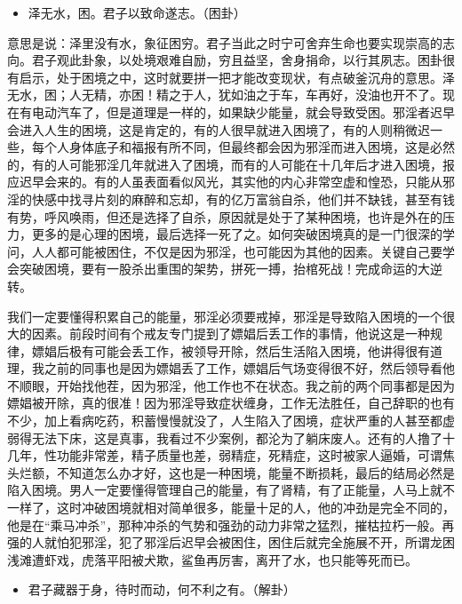 \begin{itemize}\it
    \item 泽无水，困。君子以致命遂志。（困卦）
\end{itemize}

意思是说：泽里没有水，象征困穷。君子当此之时宁可舍弃生命也要实现崇高的志向。君子观此卦象，以处境艰难自励，穷且益坚，舍身捐命，以行其夙志。困卦很有启示，处于困境之中，这时就要拼一把才能改变现状，有点破釜沉舟的意思。泽无水，困；人无精，亦困！精之于人，犹如油之于车，车再好，没油也开不了。现在有电动汽车了，但是道理是一样的，如果缺少能量，就会导致受困。邪淫者迟早会进入人生的困境，这是肯定的，有的人很早就进入困境了，有的人则稍微迟一些，每个人身体底子和福报有所不同，但最终都会因为邪淫而进入困境，这是必然的，有的人可能邪淫几年就进入了困境，而有的人可能在十几年后才进入困境，报应迟早会来的。有的人虽表面看似风光，其实他的内心非常空虚和惶恐，只能从邪淫的快感中找寻片刻的麻醉和忘却，有的亿万富翁自杀，他们并不缺钱，甚至有钱有势，呼风唤雨，但还是选择了自杀，原因就是处于了某种困境，也许是外在的压力，更多的是心理的困境，最后选择一死了之。如何突破困境真的是一门很深的学问，人人都可能被困住，不仅是因为邪淫，也可能因为其他的因素。关键自己要学会突破困境，要有一股杀出重围的架势，拼死一搏，抬棺死战！完成命运的大逆转。

我们一定要懂得积累自己的能量，邪淫必须要戒掉，邪淫是导致陷入困境的一个很大的因素。前段时间有个戒友专门提到了嫖娼后丢工作的事情，他说这是一种规律，嫖娼后极有可能会丢工作，被领导开除，然后生活陷入困境，他讲得很有道理，我之前的同事也是因为嫖娼丢了工作，嫖娼后气场变得很不好，然后领导看他不顺眼，开始找他茬，因为邪淫，他工作也不在状态。我之前的两个同事都是因为嫖娼被开除，真的很准！因为邪淫导致症状缠身，工作无法胜任，自己辞职的也有不少，加上看病吃药，积蓄慢慢就没了，人生陷入了困境，症状严重的人甚至都虚弱得无法下床，这是真事，我看过不少案例，都沦为了躺床废人。还有的人撸了十几年，性功能非常差，精子质量也差，弱精症，死精症，这时被家人逼婚，可谓焦头烂额，不知道怎么办才好，这也是一种困境，能量不断损耗，最后的结局必然是陷入困境。男人一定要懂得管理自己的能量，有了肾精，有了正能量，人马上就不一样了，这时冲破困境就相对简单很多，能量十足的人，他的冲劲是完全不同的，他是在“乘马冲杀”，那种冲杀的气势和强劲的动力非常之猛烈，摧枯拉朽一般。再强的人就怕犯邪淫，犯了邪淫后迟早会被困住，困住后就完全施展不开，所谓龙困浅滩遭虾戏，虎落平阳被犬欺，鲨鱼再厉害，离开了水，也只能等死而已。

\begin{itemize}\it
    \item 君子藏器于身，待时而动，何不利之有。（解卦）
\end{itemize}


